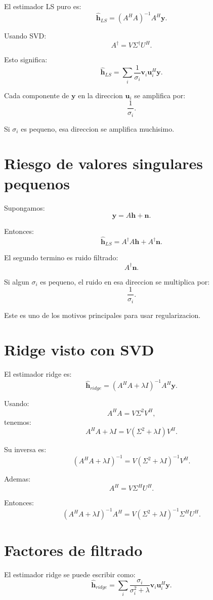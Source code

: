\documentclass[11pt]{article}
\begin{document}
El estimador LS puro es:
\[
    \hat{\bm h}_{LS} = (A^H A)^{-1}A^H\bm y.
\]

Usando SVD:
\[
    A^\dagger = V\Sigma^\dagger U^H.
\]

Esto significa:
\[
    \hat{\bm h}_{LS}
    =
    \sum_i
    \frac{1}{\sigma_i}
    \bm v_i
    \bm u_i^H
    \bm y.
\]

Cada componente de \(\bm y\) en la direccion \(\bm u_i\) se amplifica por:
\[
    \frac{1}{\sigma_i}.
\]

Si \(\sigma_i\) es pequeno, esa direccion se amplifica muchisimo.

\section{Riesgo de valores singulares pequenos}

Supongamos:
\[
    \bm y = A\bm h + \bm n.
\]

Entonces:
\[
    \hat{\bm h}_{LS}
    =
    A^\dagger A\bm h
    +
    A^\dagger \bm n.
\]

El segundo termino es ruido filtrado:
\[
    A^\dagger \bm n.
\]

Si algun \(\sigma_i\) es pequeno, el ruido en esa direccion se multiplica por:
\[
    \frac{1}{\sigma_i}.
\]

Este es uno de los motivos principales para usar regularizacion.

\section{Ridge visto con SVD}

El estimador ridge es:
\[
    \hat{\bm h}_{ridge}
    =
    (A^H A+\lambda I)^{-1}A^H\bm y.
\]

Usando:
\[
    A^H A = V\Sigma^2 V^H,
\]
tenemos:
\[
    A^H A+\lambda I
    =
    V(\Sigma^2+\lambda I)V^H.
\]

Su inversa es:
\[
    (A^H A+\lambda I)^{-1}
    =
    V(\Sigma^2+\lambda I)^{-1}V^H.
\]

Ademas:
\[
    A^H = V\Sigma^H U^H.
\]

Entonces:
\[
    (A^H A+\lambda I)^{-1}A^H
    =
    V(\Sigma^2+\lambda I)^{-1}\Sigma^H U^H.
\]

\section{Factores de filtrado}

El estimador ridge se puede escribir como:
\[
    \hat{\bm h}_{ridge}
    =
    \sum_i
    \frac{\sigma_i}{\sigma_i^2+\lambda}
    \bm v_i
    \bm u_i^H
    \bm y.
\]
\end{document}
